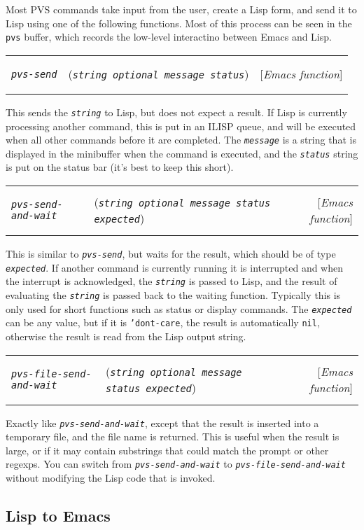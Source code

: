 \documentclass[12pt]{book}
\makeatletter
\def\ampoptional{{\smaller\sc {\smaller\smaller \&}optional\ }}
\newenvironment{function}[3]%
{\par\noindent\begin{boxedminipage}{\textwidth}%
 \par\noindent\begin{tabularx}{\linewidth}{l>{\raggedright}Xr}%
 \functionhtgt{#1}&(\texttt{\textit{#2}})&[\emph{#3}]%
 \end{tabularx}\par\flushright\begin{minipage}{.97\textwidth}}
{\end{minipage}\end{boxedminipage}}
\newcommand{\functionarg}[1]{\texttt{\textit{#1}}}
\newcommand{\functionnm}[1]{\texttt{\textit{#1}}}
\newcommand{\functionhtgt}[1]{\hypertarget{#1}{\functionnm{#1}}\index{#1@\functionnm{#1}|underline}}
\newenvironment{emacsfunction}[2]%
{\begin{function}{#1}{#2}{Emacs function}}{\end{function}}
\makeatother
\begin{document}
Most PVS commands take input from the user, create a Lisp form, and send
it to Lisp using one of the following functions.  Most of this process can
be seen in the \texttt{pvs} buffer, which records the low-level
interactino between Emacs and Lisp.

\begin{emacsfunction}{pvs-send}{string \ampoptional message status}
This sends the \functionarg{string} to Lisp, but does not expect a
result.  If Lisp is currently processing another command, this is put in
an ILISP queue, and will be executed when all other commands before it are
completed.  The \functionarg{message} is a string that is displayed in the
minibuffer when the command is executed, and the \functionarg{status}
string is put on the status bar (it's best to keep this short).
\end{emacsfunction}

\begin{emacsfunction}{pvs-send-and-wait}
{string \ampoptional message status expected}

This is similar to \functionnm{pvs-send}, but waits for the result, which
should be of type \functionarg{expected}.  If another command is currently
running it is interrupted and when the interrupt is acknowledged, the
\functionarg{string} is passed to Lisp, and the result of evaluating the
\functionarg{string} is passed back to the waiting function.  Typically
this is only used for short functions such as status or display commands.
The \functionarg{expected} can be any value, but if it is
\texttt{'dont-care}, the result is automatically \texttt{nil}, otherwise
the result is read from the Lisp output string.
\end{emacsfunction}

\begin{emacsfunction}{pvs-file-send-and-wait}
{string \ampoptional message status expected}

Exactly like \functionnm{pvs-send-and-wait}, except that the result is 
inserted into a temporary file, and the file name is returned.  This
is useful when the result is large, or if it may contain substrings that
could match the prompt or other regexps.  You can switch from
\functionnm{pvs-send-and-wait} to \functionnm{pvs-file-send-and-wait}
without modifying the Lisp code that is invoked.
\end{emacsfunction}


\subsection{Lisp to Emacs}
\label{lisp-to-emacs}
\end{document}

